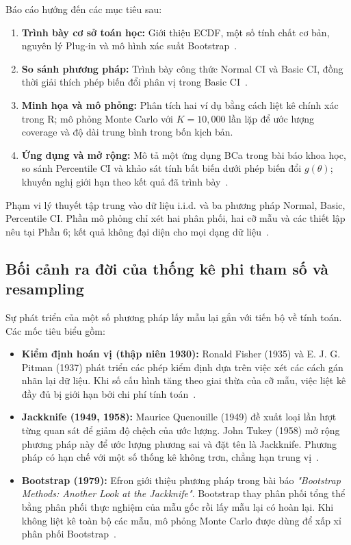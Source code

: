 \documentclass[12pt,a4paper]{article}
\theoremstyle{definition}
\numberwithin{equation}{section}
\begin{document}
	Báo cáo hướng đến các mục tiêu sau:
	\begin{enumerate}
		\item \textbf{Trình bày cơ sở toán học:} Giới thiệu ECDF, một số tính chất cơ bản, nguyên lý Plug-in và mô hình xác suất Bootstrap~\cite{rizzo2019,efron1993}.
		\item \textbf{So sánh phương pháp:} Trình bày công thức Normal CI và Basic CI, đồng thời giải thích phép biến đổi phân vị trong Basic CI~\cite{rizzo2019,davison1997,justus2024}.
		\item \textbf{Minh họa và mô phỏng:} Phân tích hai ví dụ bằng cách liệt kê chính xác trong R; mô phỏng Monte Carlo với $K=10{,}000$ lần lặp để ước lượng coverage và độ dài trung bình trong bốn kịch bản.
		\item \textbf{Ứng dụng và mở rộng:} Mô tả một ứng dụng BCa trong bài báo khoa học, so sánh Percentile CI và khảo sát tính bất biến dưới phép biến đổi $g(\theta)$; khuyến nghị giới hạn theo kết quả đã trình bày~\cite{efron1993,deng2013}.
	\end{enumerate}

	Phạm vi lý thuyết tập trung vào dữ liệu i.i.d. và ba phương pháp Normal, Basic, Percentile CI. Phần mô phỏng chỉ xét hai phân phối, hai cỡ mẫu và các thiết lập nêu tại Phần 6; kết quả không đại diện cho mọi dạng dữ liệu~\cite[tr. 18--22]{davison1997}.

	\subsection{Bối cảnh ra đời của thống kê phi tham số và resampling}
	Sự phát triển của một số phương pháp lấy mẫu lại gắn với tiến bộ về tính toán. Các mốc tiêu biểu gồm:
	\begin{itemize}
		\item \textbf{Kiểm định hoán vị (thập niên 1930):} Ronald Fisher (1935) và E. J. G. Pitman (1937) phát triển các phép kiểm định dựa trên việc xét các cách gán nhãn lại dữ liệu. Khi số cấu hình tăng theo giai thừa của cỡ mẫu, việc liệt kê đầy đủ bị giới hạn bởi chi phí tính toán~\cite{efron1979,efron1993}.
		\item \textbf{Jackknife (1949, 1958):} Maurice Quenouille (1949) đề xuất loại lần lượt từng quan sát để giảm độ chệch của ước lượng. John Tukey (1958) mở rộng phương pháp này để ước lượng phương sai và đặt tên là Jackknife. Phương pháp có hạn chế với một số thống kê không trơn, chẳng hạn trung vị~\cite{efron1979,efron1993}.
		\item \textbf{Bootstrap (1979):} Efron giới thiệu phương pháp trong bài báo \textit{"Bootstrap Methods: Another Look at the Jackknife"}. Bootstrap thay phân phối tổng thể bằng phân phối thực nghiệm của mẫu gốc rồi lấy mẫu lại có hoàn lại. Khi không liệt kê toàn bộ các mẫu, mô phỏng Monte Carlo được dùng để xấp xỉ phân phối Bootstrap~\cite{efron1979,efron1993}.
	\end{itemize}
\end{document}
